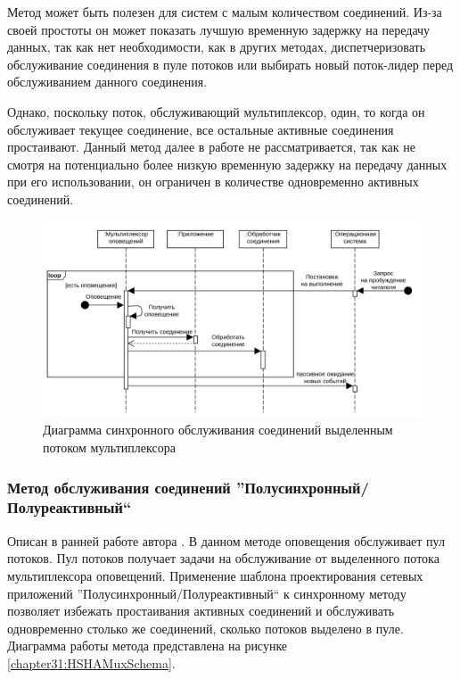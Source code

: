 Метод может быть полезен для систем с малым количеством соединений. Из-за своей простоты он может показать лучшую временную задержку на передачу данных, так как нет необходимости, как в других методах, диспетчеризовать обслуживание соединения в пуле потоков или выбирать новый поток-лидер перед обслуживанием данного соединения.

Однако, поскольку поток, обслуживающий мультиплексор, один, то когда он обслуживает текущее соединение, все остальные активные соединения простаивают. Данный метод далее в работе не рассматривается, так как не смотря на потенциально более низкую временную задержку на передачу данных при его использовании, он ограничен в количестве одновременно активных соединений.

\begin{figure}[!h]
\caption{Диаграмма синхронного обслуживания соединений выделенным потоком мультиплексора}
\label{chapter31:SyncMuxSchema}
\includegraphics[width=\textwidth]{../../graphics/schemes/SyncMuxSequence}
\end{figure}


\subsubsection{Метод обслуживания соединений ''Полусинхронный/Полуреактивный``}\label{chapter31:BlockingHSHA}
Описан в ранней работе автора \cite{GubarevFutex}.
В данном методе оповещения обслуживает пул потоков. Пул потоков получает задачи на обслуживание от выделенного потока мультиплексора оповещений. Применение шаблона проектирования сетевых приложений ''Полусинхронный/Полуреактивный`` \cite{schmidt1995half} к синхронному методу позволяет избежать простаивания активных соединений и обслуживать одновременно столько же соединений, сколько потоков выделено в пуле. Диаграмма работы метода представлена на рисунке \ref{chapter31:HSHAMuxSchema}.

